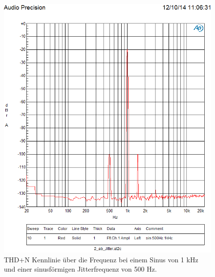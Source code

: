 \begin{figure}[h!]
\centering
\includegraphics[width=\columnwidth]{figures/Aufg2/10.PNG} 
\caption{THD+N Kennlinie über die Frequenz bei einem Sinus von 1 kHz und einer sinusförmigen Jitterfrequenz von 500 Hz.}
\label{fig:2}
\end{figure}


